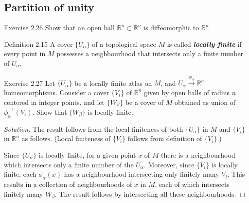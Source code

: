 \subsection{Partition of unity}

\begin{thing4}{Exercise 2.26}\label{exer:2.26}\leavevmode
Show that an open ball \(\mathbb{B}^n \subset \mathbb{R}^n\) is diffeomorphic to \(\mathbb{R}^n\).
\end{thing4}

\begin{thing4}{Definition 2.15}\label{def:2.15}\leavevmode
A cover \(\{U_\alpha\}\) of a topological space \(M\) is called \textit{\textbf{locally finite}} if every point in \(M\) possesses a neighbourhood that intersects only a finite number of \(U_\alpha\).
\end{thing4}

\begin{thing4}{Exercise 2.27}\label{exer:2.27}\leavevmode
Let \(\{U_\alpha\}\) be a locally finite atlas on \(M\), and \(U_\alpha\xrightarrow{\phi_\alpha}\mathbb{R}^n\) homeomorphisms. Consider a cover \(\{V_i\}\) of \( \mathbb{R}^n\) given by open balls of radius $n$ centered in integer points, and let \(\{ W_\beta\}\) be a cover of \(M\) obtained as union of \(\phi^{-1}_\alpha(V_i)\). Show that \(\{W_\beta\}\) is locally finite.
\end{thing4}

\begin{proof}[Solution]\leavevmode
 The result follows from the local finiteness of both \(\{U_\alpha\}\) in \(M\) and \(\{V_i\}\) in \(\mathbb{R}^n\) as follows. (Local finiteness of \(\{V_i\}\) follows from definition of \(\{V_i\}\).)

Since \(\{U_\alpha\}\) is locally finite, for a given point $x$ of \(M\) there is a neighbourhood which intersects only a finite number of the \(U_\alpha\). Moreover, since  \(\{V_i\}\) is locally finite, each \(\phi_\alpha(x)\) has a neighbourhood intersecting only finitely many \(V_i\). This results in a collection of neighbourhoods of \(x\) in \(M\), each of which intersects finitely many \(W_\beta\). The result follows by intersecting all these neighbourhoods.

\end{proof}

